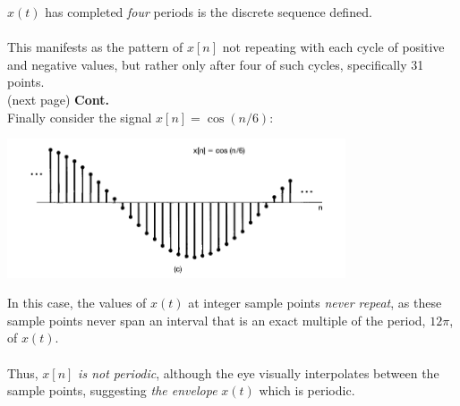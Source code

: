 \documentclass{report}
\begin{document}
$x(t)$ has completed \textit{four} periods is the discrete sequence defined.\\
\vspace{1mm}\\
This manifests as the pattern of $x[n]$ not repeating with each cycle of positive and negative values, but rather
only after four of such cycles, specifically 31 points.\\
(next page)\newpage
\noindent\textbf{Cont.}\\
Finally consider the signal $x[n]=\cos(n/6)$:
\begin{center}
\includegraphics[width=10cm]{a5}
\end{center}
In this case, the values of $x(t)$ at integer sample points \textit{never repeat}, as these sample points never
span an interval that is an exact multiple of the period,
$12\pi$, of $x(t)$.\\
\vspace{1mm}\\
Thus, $x[n]$ \textit{is not periodic}, although the eye visually interpolates between the sample points,
suggesting \textit{the envelope} $x(t)$ which is periodic.
\newpage
\end{document}
